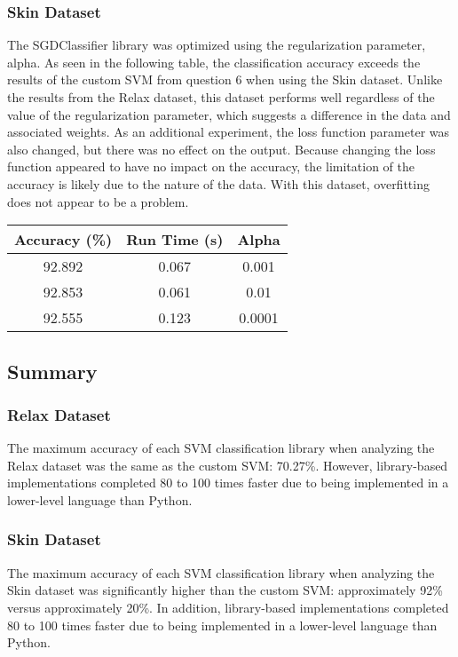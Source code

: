\documentclass[letterpaper]{article}
\begin{document}
\subsubsection{Skin Dataset}
The SGDClassifier library was optimized using the regularization parameter, alpha. As seen in the following table, the classification accuracy exceeds the results of the custom SVM from question 6 when using the Skin dataset. Unlike the results from the Relax dataset, this dataset performs well regardless of the value of the regularization parameter, which suggests a difference in the data and associated weights. As an additional experiment, the loss function parameter was also changed, but there was no effect on the output. Because changing the loss function appeared to have no impact on the accuracy, the limitation of the accuracy is likely due to the nature of the data. With this dataset, overfitting does not appear to be a problem.
\begin{center}
\begin{tabular}{|c c c|} 
 \hline
 Accuracy (\%) & Run Time (s) & Alpha \\
 \hline
 92.892 & 0.067 & 0.001 \\
 \hline
 92.853 & 0.061 & 0.01 \\
 \hline
 92.555 & 0.123 & 0.0001 \\
 \hline
\end{tabular}
\end{center}

\subsection{Summary}
\subsubsection{Relax Dataset}
The maximum accuracy of each SVM classification library when analyzing the Relax dataset was the same as the custom SVM: 70.27\%. However, library-based implementations completed 80 to 100 times faster due to being implemented in a lower-level language than Python.
\subsubsection{Skin Dataset}
The maximum accuracy of each SVM classification library when analyzing the Skin dataset was significantly higher than the custom SVM: approximately 92\% versus approximately 20\%. In addition, library-based implementations completed 80 to 100 times faster due to being implemented in a lower-level language than Python.
\end{document}
